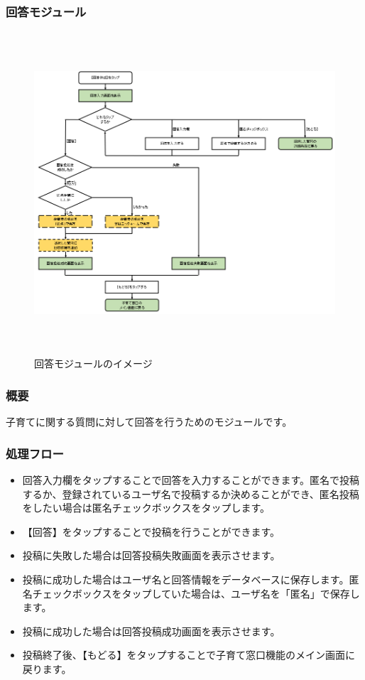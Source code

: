 \documentclass[a4j]{jarticle}
\begin{document}
\subsubsection{回答モジュール\label{回答}} %
\begin{figure}[H]
    \begin{center}
      \includegraphics[height = 12.0cm] {子育て窓口_回答.png} %
    \caption {回答モジュールのイメージ}
    \label{functionselection}
    \end{center}
\end{figure}
\subsubsection*{概要}
子育てに関する質問に対して回答を行うためのモジュールです。
\subsubsection*{処理フロー}
\begin{itemize}
\item 回答入力欄をタップすることで回答を入力することができます。匿名で投稿するか、登録されているユーザ名で投稿するか決めることができ、匿名投稿をしたい場合は匿名チェックボックスをタップします。
\item 【回答】をタップすることで投稿を行うことができます。
\item 投稿に失敗した場合は回答投稿失敗画面を表示させます。
\item 投稿に成功した場合はユーザ名と回答情報をデータベースに保存します。匿名チェックボックスをタップしていた場合は、ユーザ名を「匿名」で保存します。
\item 投稿に成功した場合は回答投稿成功画面を表示させます。
\item 投稿終了後、【もどる】をタップすることで子育て窓口機能のメイン画面に戻ります。

\end{itemize}
\end{document}
